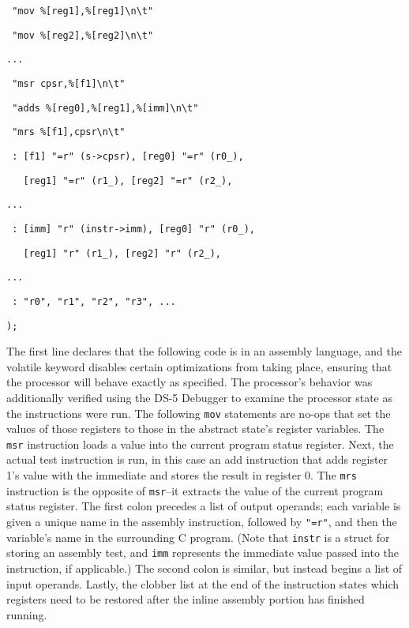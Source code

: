 \documentclass[letterpaper,12pt]{article}
\begin{document}
\texttt{\ "mov \%[reg1],\%[reg1]\textbackslash n\textbackslash t"}

\texttt{\ "mov \%[reg2],\%[reg2]\textbackslash n\textbackslash t"}

\texttt{...}

\texttt{\ "msr cpsr,\%[f1]\textbackslash n\textbackslash t"}

\texttt{\ "adds \%[reg0],\%[reg1],\%[imm]\textbackslash n\textbackslash t"}

\texttt{\ "mrs \%[f1],cpsr\textbackslash n\textbackslash t"}
                
\texttt{\ : [f1] "=r" (s->cpsr), [reg0] "=r" (r0\_),}

\texttt{\ \ \ [reg1] "=r" (r1\_), [reg2] "=r" (r2\_),}

\texttt{...}

\texttt{\ : [imm] "r" (instr->imm), [reg0] "r" (r0\_),}

\texttt{\ \ \ [reg1] "r" (r1\_), [reg2] "r" (r2\_),}

\texttt{...}

\texttt{\ : "r0", "r1", "r2", "r3", ...}
            
\texttt{);}

The first line declares that the following code is in an assembly language, and the volatile keyword disables certain optimizations from taking place, ensuring that the processor will behave exactly as specified. The processor's behavior was additionally verified using the DS-5 Debugger\cite{Debug} to examine the processor state as the instructions were run. The following \texttt{mov} statements are no-ops that set the values of those registers to those in the abstract state's register variables. The \texttt{msr} instruction loads a value into the current program status register. Next, the actual test instruction is run, in this case an add instruction that adds register 1's value with the immediate and stores the result in register 0. The \texttt{mrs} instruction is the opposite of \texttt{msr}--it extracts the value of the current program status register. The first colon precedes a list of output operands; each variable is given a unique name in the assembly instruction, followed by \texttt{"=r"}, and then the variable's name in the surrounding C program. (Note that \texttt{instr} is a struct for storing an assembly test, and \texttt{imm} represents the immediate value passed into the instruction, if applicable.) The second colon is similar, but instead begins a list of input operands. Lastly, the clobber list at the end of the instruction states which registers need to be restored after the inline assembly portion has finished running.
\end{document}
